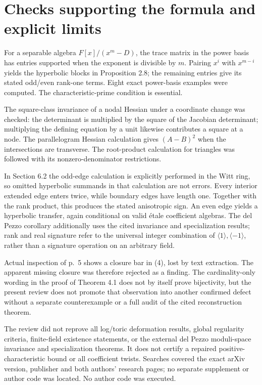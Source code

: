 \documentclass[10pt]{article}
\begin{document}
\section*{Checks supporting the formula and explicit limits}
For a separable algebra \(F[x]/(x^m-D)\), the trace matrix in the power basis has entries supported when the exponent is divisible by \(m\). Pairing \(x^i\) with \(x^{m-i}\) yields the hyperbolic blocks in Proposition 2.8; the remaining entries give its stated odd/even rank-one terms. Eight exact power-basis examples were computed. The characteristic-prime condition is essential.\par
The square-class invariance of a nodal Hessian under a coordinate change was checked: the determinant is multiplied by the square of the Jacobian determinant; multiplying the defining equation by a unit likewise contributes a square at a node. The parallelogram Hessian calculation gives \((A-B)^2\) when the intersections are transverse. The root-product calculation for triangles was followed with its nonzero-denominator restrictions.\par
In Section 6.2 the odd-edge calculation is explicitly performed in the Witt ring, so omitted hyperbolic summands in that calculation are not errors. Every interior extended edge enters twice, while boundary edges have length one. Together with the rank product, this produces the stated anisotropic sign. An even edge yields a hyperbolic transfer, again conditional on valid étale coefficient algebras. The del Pezzo corollary additionally uses the cited invariance and specialization results; rank and real signature refer to the universal integer combination of \(\langle1\rangle,\langle-1\rangle\), rather than a signature operation on an arbitrary field.\par
Actual inspection of p. 5 shows a closure bar in (4), lost by text extraction. The apparent missing closure was therefore rejected as a finding. The cardinality-only wording in the proof of Theorem 4.1 does not by itself prove bijectivity, but the present review does not promote that observation into another confirmed defect without a separate counterexample or a full audit of the cited reconstruction theorem.\par
The review did not reprove all log/toric deformation results, global regularity criteria, finite-field existence statements, or the external del Pezzo moduli-space invariance and specialization theorems. It does not certify a repaired positive-characteristic bound or all coefficient twists. Searches covered the exact arXiv version, publisher and both authors’ research pages; no separate supplement or author code was located. No author code was executed.\par
\end{document}
